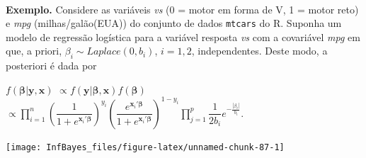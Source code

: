 \documentclass[
]{book}
\newenvironment{Shaded}{\begin{snugshade}}{\end{snugshade}}
\newcommand{\CommentTok}[1]{\textcolor[rgb]{0.56,0.35,0.01}{\textit{#1}}}
\newcommand{\DataTypeTok}[1]{\textcolor[rgb]{0.13,0.29,0.53}{#1}}
\newcommand{\KeywordTok}[1]{\textcolor[rgb]{0.13,0.29,0.53}{\textbf{#1}}}
\newcommand{\NormalTok}[1]{#1}
\newcommand{\OperatorTok}[1]{\textcolor[rgb]{0.81,0.36,0.00}{\textbf{#1}}}
\newcommand{\StringTok}[1]{\textcolor[rgb]{0.31,0.60,0.02}{#1}}
\begin{document}
\(~\)

\textbf{Exemplo.} Considere as variáveis \emph{vs} (0 = motor em forma de V, 1 = motor reto) e \emph{mpg} (milhas/galão(EUA)) do conjunto de dados \texttt{mtcars} do R. Suponha um modelo de regressão logística para a variável resposta \emph{vs} com a covariável \emph{mpg} em que, a priori, \(\beta_i \sim \textit{Laplace}(0,b_i)\), \(i=1,2\), independentes. Deste modo, a posteriori é dada por

\(f(\boldsymbol\beta | \boldsymbol{y},\boldsymbol{x})\)
\(\propto f(\boldsymbol{y}|\boldsymbol\beta,\boldsymbol{x})f(\boldsymbol\beta)\)
\(\propto \displaystyle\prod_{i=1}^{n} \left(\dfrac{1}{1+e^{\boldsymbol x_i' \boldsymbol\beta}}\right)^{y_i}\left(\dfrac{e^{\boldsymbol x_i' \boldsymbol\beta}}{1+e^{\boldsymbol x_i' \boldsymbol\beta}}\right)^{1-y_i} \prod_{j=1}^{p} \dfrac{1}{2b_i} e^{-\frac{|\beta_i|}{b_i}}\).

\begin{Shaded}
\end{Shaded}

\begin{center}\texttt{[image: InfBayes\_files/figure-latex/unnamed-chunk-87-1]} \end{center}
\end{document}
